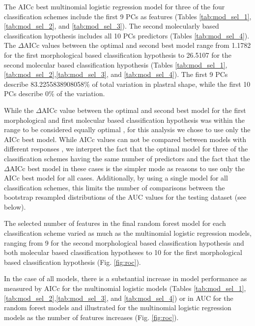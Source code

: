 \documentclass[12pt,letterpaper]{article}\usepackage{graphicx, color}
\begin{document}
The AICc best multinomial logistic regression model for three of the four classification schemes include the first 9 PCs as features (Tables \ref{tab:mod_sel_1}, \ref{tab:mod_sel_2}, and \ref{tab:mod_sel_3}). The second molecularly based classification hypothesis includes all 10 PCs predictors (Tables \ref{tab:mod_sel_4}).
The \(\Delta\)AICc values between the optimal and second best model range from 1.1782 for the first morphological based classification hypothesis to 26.5107 for the second molecular based classification hypothesis (Tables \ref{tab:mod_sel_1},\ref{tab:mod_sel_2},\ref{tab:mod_sel_3}, and \ref{tab:mod_sel_4}). The first 9 PCs describe 83.2255838908058\% of total variation in plastral shape, while the first 10 PCs describe 0\% of the variation.

While the \(\Delta\)AICc value between the optimal and second best model for the first morphological and first molecular based classification hypothesis was within the range to be considered equally optimal \citep{Burnham2002a}, for this analysis we chose to use only the AICc best model. While AICc values can not be compared between models with different responses \citep{Burnham2002a}, we interpret the fact that the optimal model for three of the classification schemes having the same number of predictors and the fact that the \(\Delta\)AICc best model in these cases is the simpler mode as reasons to use only the AICc best model for all cases. 
Additionally, by using a single model for all classification schemes, this limits the number of comparisons between the bootstrap resampled distributions of the AUC values for the testing dataset (see below).




The selected number of features in the final random forest model for each classification scheme varied as much as the multinomial logistic regression models, ranging from 9 for the second morphological based classification hypothesis and both molecular based classification hypotheses to 10 for the first morphological based classification hypothesis (Fig. \ref{fig:roc}). 


In the case of all models, there is a substantial increase in model performance as measured by AICc for the multinomial logistic models (Tables \ref{tab:mod_sel_1},\ref{tab:mod_sel_2},\ref{tab:mod_sel_3}, and \ref{tab:mod_sel_4}) or in AUC for the random forest models and illustrated for the multinomial logistic regression models as the number of features increases (Fig. \ref{fig:roc}). 
\end{document}
